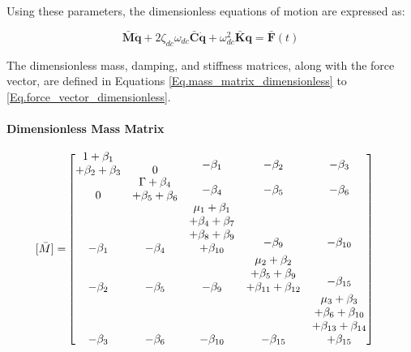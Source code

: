 \documentclass[12pt,a4paper]{article}
\begin{document}
Using these parameters, the dimensionless equations of motion are expressed as:

\begin{equation}\label{Eq.EOM_dimensionless}
\mathbf{\bar{M}} \ddot{\mathbf{q}} + 2 \zeta_{dc} \omega_{dc} \mathbf{\bar{C}} \dot{\mathbf{q}} + \omega_{dc}^2 \mathbf{\bar{K}} \mathbf{q} = \mathbf{\bar{F}}(t)
\end{equation}

The dimensionless mass, damping, and stiffness matrices, along with the force vector, are defined in Equations \eqref{Eq.mass_matrix_dimensionless} to \eqref{Eq.force_vector_dimensionless}.

\paragraph{Dimensionless Mass Matrix}

\begin{equation}\label{Eq.mass_matrix_dimensionless}
\begin{aligned}
[\bar{M}] =& 
\begin{bmatrix}
\shortstack{$1 + \beta_1$ \\ $+ \beta_2 + \beta_3$} & 0 & \shortstack{$-\beta_1$ \\ \,} & \shortstack{$-\beta_2$ \\ \,} & \shortstack{$-\beta_3$ \\ \,} \\
0 & \shortstack{$\Gamma + \beta_4$ \\ $+ \beta_5 + \beta_6$} & \shortstack{$-\beta_4$ \\ \,} & \shortstack{$-\beta_5$ \\ \,} & \shortstack{$-\beta_6$ \\ \,} \\
-\beta_1 & -\beta_4 & \shortstack{$\mu_1 + \beta_1$ \\ $+ \beta_4 + \beta_7$ \\ $+ \beta_8 + \beta_9$ \\ $+ \beta_{10}$} & \shortstack{$-\beta_9$ \\ \,} & \shortstack{$-\beta_{10}$ \\ \,} \\
-\beta_2 & -\beta_5 & -\beta_9 & \shortstack{$\mu_2 + \beta_2$ \\ $+ \beta_5 + \beta_9$ \\ $+ \beta_{11} + \beta_{12}$} & \shortstack{$-\beta_{15}$ \\ \,} \\
-\beta_3 & -\beta_6 & -\beta_{10} & -\beta_{15} & \shortstack{$\mu_3 + \beta_3$ \\ $+ \beta_6 + \beta_{10}$ \\ $+ \beta_{13} + \beta_{14}$ \\ $+ \beta_{15}$}
\end{bmatrix}
\end{aligned}
\end{equation}
\end{document}

